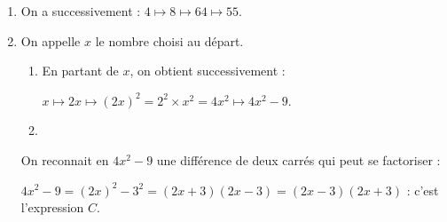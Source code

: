 \medskip

%

\begin{enumerate}
\item %
On a successivement : $4 \longmapsto 8 \longmapsto 64 \longmapsto 55$.
\item On appelle $x$ le nombre choisi au départ.
	\begin{enumerate}
		\item %
		En partant de $x$, on obtient successivement :
		
		$x \longmapsto 2x \longmapsto (2x)^2 = 2^2 \times x^2 = 4x^2 \longmapsto 4x^2 - 9$.
		\item %
	\end{enumerate}
On reconnait en $4x^2 - 9$ une différence de deux carrés qui peut se factoriser :

$4x^2 - 9 = (2x)^2 - 3^2 = (2x + 3)(2x - 3) = (2x - 3)(2x + 3)$ : c'est l'expression $C$.
\end{enumerate}

\bigskip
